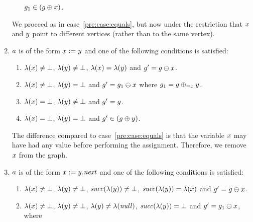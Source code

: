 \begin{enumerate}
\begin{enumerate}
    $g_1\in\left(g\oplus{\ensuremath{x}}\right)$.
  \end{enumerate}
We proceed as in case~\ref{pre:case:equals}, but now under the restriction that
$x$ and $y$ point to different vertices (rather than to the same vertex).
\item
\label{pre:case:aasigned}
  $a$ is of the form $x:=y$ and
  one of the following conditions is satisfied:
  \begin{enumerate}
  \item \label{pre:case:assignedA}%
    $\lambda(x)\neq\bot$, %
    $\lambda(y)\neq\bot$, %
    $\lambda(x)=\lambda(y)$ and
    $g'=g\ominus{\ensuremath{x}}$.
  \item \label{pre:case:assignedB}%
    $\lambda(x)\neq\bot$, %
    $\lambda(y)=\bot$ and
    $g'=g_1\ominus{\ensuremath{x}}$ where $g_1=g\oplus_{={x}}{y}$.
  \item \label{pre:case:assignedC}%
    $\lambda(x)=\bot$, %
    $\lambda(y)\neq\bot$ and %
    $g'=g$.
  \item \label{pre:case:assignedD}%
    $\lambda(x)=\bot$, %
    $\lambda(y)=\bot$ and %
    $g'\in(g\oplus{\ensuremath{y}})$.
  \end{enumerate}
The difference compared to case~\ref{pre:case:equals} is that
the variable
$x$ may have had any value before performing the assignment.
%
Therefore, we remove $x$ from the graph.
\item \label{pre:case:assignedDotNext}%
  $a$ is of the form $x:=y.{\it next}$ and
  one of the following conditions is satisfied:
  \begin{enumerate}
  \item \label{pre:case:assignedDotNextA}%
    $\lambda(x)\neq\bot$, %
    $\lambda(y)\neq\bot$, %
    ${\it succ}(\lambda(y))\neq\bot$, %
    ${\it succ}(\lambda(y))=\lambda(x)$ and
    $g'=g\ominus{\ensuremath{x}}$.
  \item \label{pre:case:assignedDotNextB}%
    $\lambda(x)\neq\bot$, %
    $\lambda(y)\neq\bot$, %
    $\lambda(y)\neq\lambda({\it null})$, %
    ${\it succ}(\lambda(y))=\bot$ and
    $g'=g_1\ominus{\ensuremath{x}}$, where

\end{enumerate}
\end{enumerate}
